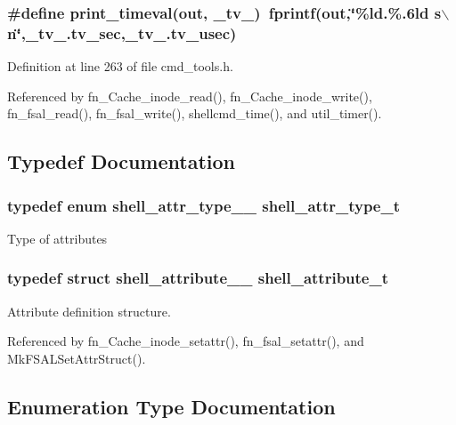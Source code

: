 \subsubsection{\setlength{\rightskip}{0pt plus 5cm}\#define print\_\-timeval(out, \_\-tv\_\-)\ fprintf(out,\char`\"{}\%ld.\%.6ld s$\backslash$n\char`\"{},\_\-tv\_\-.tv\_\-sec,\_\-tv\_\-.tv\_\-usec)}\label{cmd__tools_8h_a0}




Definition at line 263 of file cmd\_\-tools.h.

Referenced by fn\_\-Cache\_\-inode\_\-read(), fn\_\-Cache\_\-inode\_\-write(), fn\_\-fsal\_\-read(), fn\_\-fsal\_\-write(), shellcmd\_\-time(), and util\_\-timer().

\subsection{Typedef Documentation}
\subsubsection{\setlength{\rightskip}{0pt plus 5cm}typedef enum {\bf shell\_\-attr\_\-type\_\-\_\-}  {\bf shell\_\-attr\_\-type\_\-t}}\label{cmd__tools_8h_a1}


Type of attributes 
\subsubsection{\setlength{\rightskip}{0pt plus 5cm}typedef struct {\bf shell\_\-attribute\_\-\_\-}  {\bf shell\_\-attribute\_\-t}}\label{cmd__tools_8h_a2}


Attribute definition structure. 

Referenced by fn\_\-Cache\_\-inode\_\-setattr(), fn\_\-fsal\_\-setattr(), and Mk\-FSALSet\-Attr\-Struct().

\subsection{Enumeration Type Documentation}
